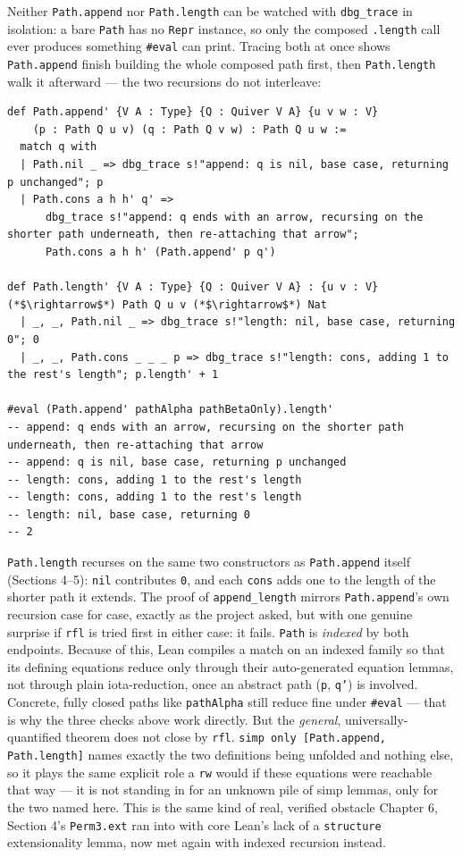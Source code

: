Neither \texttt{Path.append} nor \texttt{Path.length} can be watched with \texttt{dbg\_\allowbreak{}trace} in isolation: a bare \texttt{Path} has no \texttt{Repr} instance, so only the composed \texttt{.length} call ever produces something \texttt{\#eval} can print. Tracing both at once shows \texttt{Path.append} finish building the whole composed path first, then \texttt{Path.length} walk it afterward --- the two recursions do not interleave:

\begin{lstlisting}
def Path.append' {V A : Type} {Q : Quiver V A} {u v w : V}
    (p : Path Q u v) (q : Path Q v w) : Path Q u w :=
  match q with
  | Path.nil _ => dbg_trace s!"append: q is nil, base case, returning p unchanged"; p
  | Path.cons a h h' q' =>
      dbg_trace s!"append: q ends with an arrow, recursing on the shorter path underneath, then re-attaching that arrow";
      Path.cons a h h' (Path.append' p q')

def Path.length' {V A : Type} {Q : Quiver V A} : {u v : V} (*$\rightarrow$*) Path Q u v (*$\rightarrow$*) Nat
  | _, _, Path.nil _ => dbg_trace s!"length: nil, base case, returning 0"; 0
  | _, _, Path.cons _ _ _ p => dbg_trace s!"length: cons, adding 1 to the rest's length"; p.length' + 1

#eval (Path.append' pathAlpha pathBetaOnly).length'
-- append: q ends with an arrow, recursing on the shorter path underneath, then re-attaching that arrow
-- append: q is nil, base case, returning p unchanged
-- length: cons, adding 1 to the rest's length
-- length: cons, adding 1 to the rest's length
-- length: nil, base case, returning 0
-- 2
\end{lstlisting}

\texttt{Path.length} recurses on the same two constructors as \texttt{Path.append} itself (Sections 4--5): \texttt{nil} contributes \texttt{0}, and each \texttt{cons} adds one to the length of the shorter path it extends. The proof of \texttt{append\_\allowbreak{}length} mirrors \texttt{Path.append}'s own recursion case for case, exactly as the project asked, but with one genuine surprise if \texttt{rfl} is tried first in either case: it fails. \texttt{Path} is \emph{indexed} by both endpoints. Because of this, Lean compiles a match on an indexed family so that its defining equations reduce only through their auto-generated equation lemmas, not through plain iota-reduction, once an abstract path (\texttt{p}, \texttt{q'}) is involved. Concrete, fully closed paths like \texttt{pathAlpha} still reduce fine under \texttt{\#eval} --- that is why the three checks above work directly. But the \emph{general}, universally-quantified theorem does not close by \texttt{rfl}. \texttt{simp only [Path.append, Path.length]} names exactly the two definitions being unfolded and nothing else, so it plays the same explicit role a \texttt{rw} would if these equations were reachable that way --- it is not standing in for an unknown pile of simp lemmas, only for the two named here. This is the same kind of real, verified obstacle Chapter 6, Section 4's \texttt{Perm3.ext} ran into with core Lean's lack of a \texttt{structure} extensionality lemma, now met again with indexed recursion instead.
